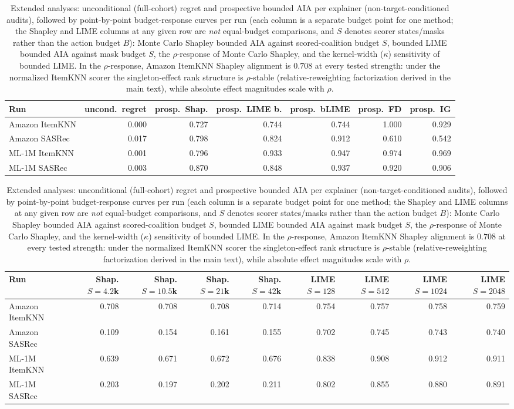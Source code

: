 \begin{table}[!htbp]\centering\scriptsize\setlength{\tabcolsep}{2.5pt}
\caption{Extended analyses: unconditional (full-cohort) regret and
prospective bounded AIA per explainer (non-target-conditioned audits),
followed by point-by-point budget-response curves per run (each column is a
separate budget point for one method; the Shapley and LIME columns at any
given row are \emph{not} equal-budget comparisons, and $S$ denotes scorer
states/masks rather than the action budget $B$): Monte Carlo Shapley bounded
AIA against scored-coalition budget $S$, bounded LIME bounded AIA against
mask budget $S$, the $\rho$-response of Monte Carlo Shapley, and the
kernel-width ($\kappa$) sensitivity of bounded LIME. In the $\rho$-response,
Amazon ItemKNN Shapley alignment is $0.708$ at every tested strength: under
the normalized ItemKNN scorer the singleton-effect rank structure is
$\rho$-stable (relative-reweighting factorization derived in the main text),
while absolute effect magnitudes scale with $\rho$.}
\label{tab:review3-ext}
\begin{tabular}{@{}lrrrrrr@{}}
\toprule
Run & uncond.\ regret & prosp.\ Shap. & prosp.\ LIME b. & prosp.\ bLIME & prosp.\ FD & prosp.\ IG \\
\midrule
Amazon ItemKNN & 0.000 & 0.727 & 0.744 & 0.744 & 1.000 & 0.929 \\
Amazon SASRec & 0.017 & 0.798 & 0.824 & 0.912 & 0.610 & 0.542 \\
ML-1M ItemKNN & 0.001 & 0.796 & 0.933 & 0.947 & 0.974 & 0.969 \\
ML-1M SASRec & 0.003 & 0.870 & 0.848 & 0.937 & 0.920 & 0.906 \\
\bottomrule
\end{tabular}
\par\vspace{2mm}
\begin{tabular}{@{}lrrrrrrrr@{}}
\toprule
Run & Shap. $S{=}4.2$k & Shap. $S{=}10.5$k & Shap. $S{=}21$k & Shap. $S{=}42$k & LIME $S{=}128$ & LIME $S{=}512$ & LIME $S{=}1024$ & LIME $S{=}2048$ \\
\midrule
Amazon ItemKNN & 0.708 & 0.708 & 0.708 & 0.714 & 0.754 & 0.757 & 0.758 & 0.759 \\
Amazon SASRec & 0.109 & 0.154 & 0.161 & 0.155 & 0.702 & 0.745 & 0.743 & 0.740 \\
ML-1M ItemKNN & 0.639 & 0.671 & 0.672 & 0.676 & 0.838 & 0.908 & 0.912 & 0.911 \\
ML-1M SASRec & 0.203 & 0.197 & 0.202 & 0.211 & 0.802 & 0.855 & 0.880 & 0.891 \\

\end{tabular}
\end{table}
